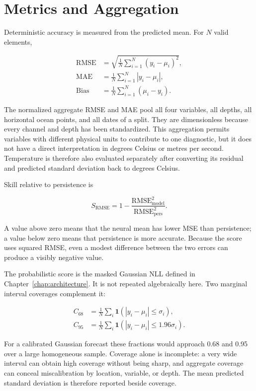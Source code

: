 \section{Metrics and Aggregation}

Deterministic accuracy is measured from the predicted mean. For $N$ valid elements,

\begin{align}
\mathrm{RMSE} &= \sqrt{\frac{1}{N}\sum_{i=1}^{N}(y_i-\mu_i)^2},\\
\mathrm{MAE} &= \frac{1}{N}\sum_{i=1}^{N}|y_i-\mu_i|,\\
\mathrm{Bias} &= \frac{1}{N}\sum_{i=1}^{N}(\mu_i-y_i).
\end{align}

The normalized aggregate RMSE and MAE pool all four variables, all depths, all horizontal ocean points, and all dates of a split. They are dimensionless because every channel and depth has been standardized. This aggregation permits variables with different physical units to contribute to one diagnostic, but it does not have a direct interpretation in degrees Celsius or metres per second. Temperature is therefore also evaluated separately after converting its residual and predicted standard deviation back to degrees Celsius.

Skill relative to persistence is

\[
S_{\mathrm{RMSE}}=1-
\frac{\mathrm{RMSE}_{\mathrm{model}}^2}
{\mathrm{RMSE}_{\mathrm{pers}}^2}.
\]

A value above zero means that the neural mean has lower MSE than persistence; a value below zero means that persistence is more accurate. Because the score uses squared RMSE, even a modest difference between the two errors can produce a visibly negative value.

The probabilistic score is the masked Gaussian NLL defined in Chapter~\ref{chap:architecture}. It is not repeated algebraically here. Two marginal interval coverages complement it:

\begin{align}
C_{68} &= \frac{1}{N}\sum_i
\mathbf{1}(|y_i-\mu_i|\leq\sigma_i),\\
C_{95} &= \frac{1}{N}\sum_i
\mathbf{1}(|y_i-\mu_i|\leq1.96\sigma_i).
\end{align}

For a calibrated Gaussian forecast these fractions would approach 0.68 and 0.95 over a large homogeneous sample. Coverage alone is incomplete: a very wide interval can obtain high coverage without being sharp, and aggregate coverage can conceal miscalibration by location, variable, or depth. The mean predicted standard deviation is therefore reported beside coverage.


